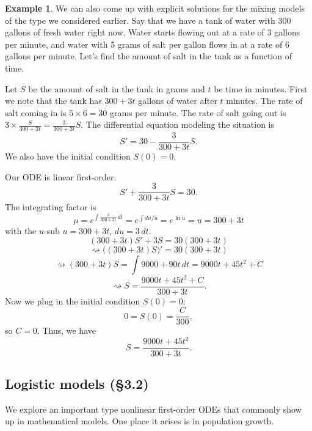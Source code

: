 \documentclass[12pt]{amsart}
\numberwithin{equation}{section}
\theoremstyle{plain} %
\newcommand{\rsa}{\rightsquigarrow}
\theoremstyle{definition}
\newtheorem{ex}[equation]{Example}
\theoremstyle{remark}
\begin{document}
\begin{ex} We can also come up with explicit solutions for the mixing models of the type we considered earlier. Say that we have a tank of water with 300 gallons of fresh water right now. Water starts flowing out at a rate of 3 gallons per minute, and water with 5 grams of salt per gallon flows in at a rate of 6 gallons per minute. Let's find the amount of salt in the tank as a function of time.

Let $S$ be the amount of salt in the tank in grams and $t$ be time in minutes. First we note that the tank has $300 + 3t$ gallons of water after $t$ minutes. The rate of salt coming in is $5 \times 6 = 30$ grams per minute. The rate of salt going out is $3\times \frac{S}{300 + 3t} = \frac{3}{300 + 3t} S$. The differential equation modeling the situation is
\[ S' = 30 - \frac{3}{300 + 3t} S.\]
We also have the initial condition $S(0)=0$.

Our ODE is linear first-order.
\[ S' +  \frac{3}{300 + 3t} S = 30.\]
The integrating factor is
\[ \mu = e^{\int \frac{3}{300+ 3t} \, dt} = e^{\int du / u} = e^{\ln u} = u = 300+3t\]
with the $u$-sub $u=300+3t$, $du = 3 \, dt$.
\[ (300+3t) S' + 3 S = 30(300+3t)\]
\[ \rsa \big( (300+3t) S \big)' = 30(300+3t)\]
\[\rsa  (300 + 3t) S = \int 9000 + 90t \, dt = 9000 t + 45 t^2 + C\]
\[\rsa S = \frac{9000 t + 45 t^2 + C}{300 + 3t}.\]
Now we plug in the initial condition $S(0)=0$:
\[ 0 = S(0) = \frac{C}{300},\]
so $C=0$. Thus, we have
\[  S = \frac{9000 t + 45 t^2}{300 + 3t}.\]
\end{ex}

\subsection*{Logistic models (\S3.2)}

We explore an important type nonlinear first-order ODEs that commonly show up in mathematical models. One place it arises is in population growth.
\end{document}
